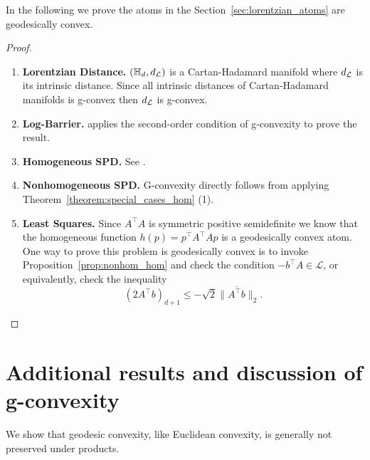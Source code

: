 \documentclass[twoside,11pt]{article}
\begin{document}
\begin{proposition}
    In the following we prove the atoms in the Section~\ref{sec:lorentzian_atoms} are geodesically convex.
\end{proposition}
\begin{proof}
\begin{enumerate}
    \item \textbf{Lorentzian Distance. }$(\mathbb{H}_d, d_{\mathcal{L}})$ is a Cartan-Hadamard manifold where $d_{\mathcal{L}}$ is its intrinsic distance. Since all intrinsic distances of Cartan-Hadamard manifolds is g-convex then $d_{\mathcal{L}}$ is g-convex.
    \item \textbf{Log-Barrier.}  \citep{Ferreira2022} applies the second-order condition of g-convexity to prove the result.
    \item \textbf{Homogeneous SPD.} See \citep{Ferreira2022}.
    \item \textbf{Nonhomogeneous SPD.} G-convexity directly follows from applying Theorem~\ref{theorem:special_cases_hom} (1).
    \item \textbf{Least Squares.} Since $A^\top A $ is symmetric positive semidefinite we know that the homogeneous function $h(p) = p^\top A^\top A p$ is a geodesically convex atom. One way to prove this problem is geodesically convex is to invoke Proposition~\ref{prop:nonhom_hom} and check the condition $-b^\top A \in \mathscr{L}$, or equivalently, check the inequality
\[ \left(2A^\top b\right)_{d+1} \leq - \sqrt{2}\| \overline{A^\top b}\|_2.
\]
\end{enumerate}
\end{proof}





\section{Additional results and discussion of g-convexity}\label{app:g_cvx_different_metrics}
We show that geodesic convexity, like Euclidean convexity, is generally not preserved under products. 
\end{document}
